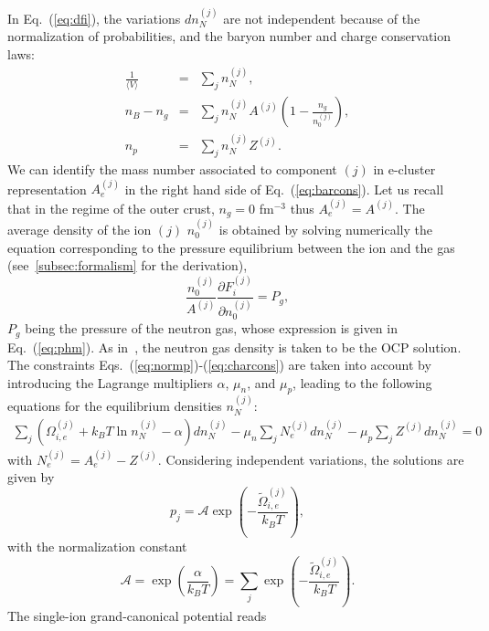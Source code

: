 In Eq.~(\ref{eq:dfi}), the variations $dn_N^{(j)}$ are not independent because 
of the normalization of probabilities, and the baryon number and charge 
conservation laws:
%
\begin{eqnarray}
  \frac{1}{\langle V\rangle} &=& \sum_j n_N^{(j)},\label{eq:normp}\\
  n_B - n_g &=& 
  \sum_j n_N^{(j)} A^{(j)}
  \left(1-\frac{n_g}{n_0^{(j)}}\right),\label{eq:barcons}\\
  n_p &=& \sum_j n_N^{(j)} Z^{(j)}\label{eq:charcons}.
\end{eqnarray}
%
We can identify the mass number associated to component $(j)$ in e-cluster 
representation $A_e^{(j)}$ in the right hand side of Eq.~(\ref{eq:barcons}).
Let us recall that in the regime of the outer crust, $n_g = 0$ fm$^{-3}$ thus
$A_e^{(j)} = A^{(j)}$. The average density of the ion $(j)$ $n_0^{(j)}$ is
obtained by solving numerically the equation corresponding to the pressure 
equilibrium between the ion and the gas (see~\ref{subsec:formalism} for the 
derivation),
%
\begin{equation}
  \frac{n_0^{(j)}}{A^{(j)}}\frac{\partial F_i^{(j)}} {\partial n_0^{(j)}} 
  = P_g,
\end{equation}
%
$P_g$ being the pressure of the neutron gas, whose expression is given in 
Eq.~(\ref{eq:phm}). As in~\cite{Grams2018}, the neutron gas density is taken to 
be the OCP solution.
The constraints Eqs.~(\ref{eq:normp})-(\ref{eq:charcons}) are taken into 
account by introducing the Lagrange multipliers $\alpha$, $\mu_n$, and $\mu_p$, 
leading to the following equations for the equilibrium densities $n_N^{(j)}$:
%
\begin{eqnarray}
  \sum_j \left(\Omega_{i,e}^{(j)} + k_B T \ln n_N^{(j)} 
  - \alpha\right)dn_N^{(j)} 
  - \mu_n \sum_j N_e^{(j)}dn_N^{(j)} - \mu_p \sum_j Z^{(j)} dn_N^{(j)}  
  = 0
\end{eqnarray}
%
with $N_e^{(j)} = A_e^{(j)} - Z^{(j)}$.
Considering independent variations, the solutions are given by
%
\begin{equation}
  p_j = \mathcal{A}\exp\left(-\frac{\tilde{\Omega}_{i,e}^{(j)}}{k_B
  T}\right),\label{eq:pj}
\end{equation}
%
with the normalization constant
%
\begin{equation}
  \mathcal{A} = \exp\left(\frac{\alpha}{k_B T}\right) = \sum_j
  \exp\left(-\frac{\tilde{\Omega}_{i,e}^{(j)}}{k_B T}\right).
\end{equation}
%
The single-ion grand-canonical potential reads
